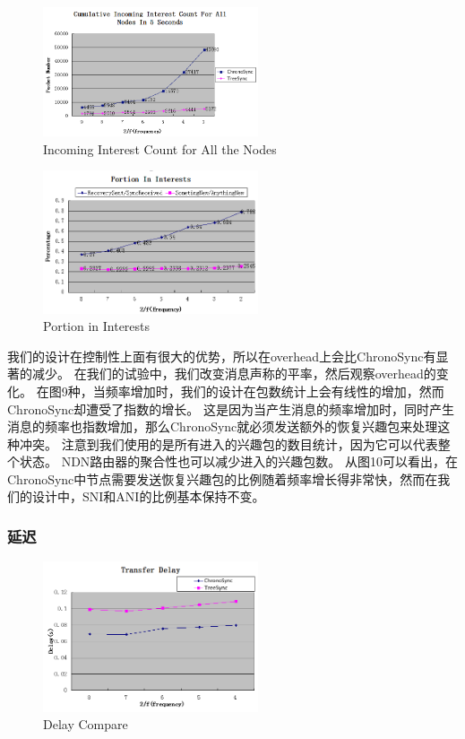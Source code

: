 \documentclass[a4paper]{article}
\begin{document}
\begin{figure}[!t]
\centering
\includegraphics[width=2.5in]{../png/all-incoming-interest-revised.png}
\caption{Incoming Interest Count for All the Nodes}
\label{overhead}
\end{figure}
\begin{figure}[!t]
\centering
\includegraphics[width=2.5in]{../png/portion-in-interests.png}
\caption{Portion in Interests}
\label{recovery_percentage}
\end{figure}

我们的设计在控制性上面有很大的优势，所以在overhead上会比ChronoSync有显著的减少。
在我们的试验中，我们改变消息声称的平率，然后观察overhead的变化。
在图9种，当频率增加时，我们的设计在包数统计上会有线性的增加，然而ChronoSync却遭受了指数的增长。
这是因为当产生消息的频率增加时，同时产生消息的频率也指数增加，那么ChronoSync就必须发送额外的恢复兴趣包来处理这种冲突。
注意到我们使用的是所有进入的兴趣包的数目统计，因为它可以代表整个状态。
NDN路由器的聚合性也可以减少进入的兴趣包数。
从图10可以看出，在ChronoSync中节点需要发送恢复兴趣包的比例随着频率增长得非常快，然而在我们的设计中，SNI和ANI的比例基本保持不变。

\subsubsection{延迟}

\begin{figure}[!t]
\centering
\includegraphics[width=2.5in]{../png/delay-compare-revised.png}
\caption{Delay Compare}
\label{delay_compare}
\end{figure}
\end{document}
